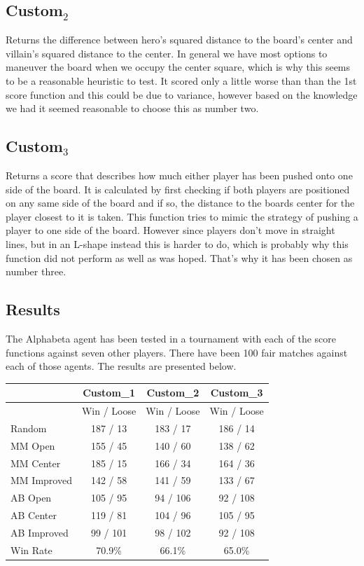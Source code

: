 \documentclass{article}
\begin{document}
\subsection{Custom$_2$}
Returns the difference between hero's squared distance to the board's center and villain's
squared distance to the center. In general we have most options to maneuver the board when
we occupy the center square, which is why this seems to be a reasonable heuristic to test.
It scored only a little worse than than the 1st score function and this could be due to
variance, however based on the knowledge we had it seemed reasonable to choose this as
number two.

\subsection{Custom$_3$}
Returns a score that describes how much either player has been pushed onto one side of the
board. It is calculated by first checking if both players are positioned on any same side
of the board and if so, the distance to the boards center for the player closest to it is
taken. This function tries to mimic the strategy of pushing a player to one side of the board.
However since players don't move in straight lines, but in an L-shape instead this is harder
to do, which is probably why this function did not perform as well as was hoped. That's why
it has been chosen as number three.

\subsection{Results}
The Alphabeta agent has been tested in a tournament with each of the score functions
against seven other players. There have been 100 fair matches against each of those
agents. The results are presented below.

\begin{center}
  \begin{tabular}{ | l || c | c | c | }
    \hline
                     & Custom_1     & Custom_2      & Custom_3    \\ \hline
                     & Win / Loose  & Win / Loose   & Win / Loose \\ \hline \hline
      Random         & 187 / 13     & 183 / 17      & 186 / 14    \\ \hline
      MM Open        & 155 / 45     & 140 / 60      & 138 / 62    \\ \hline
      MM Center      & 185 / 15     & 166 / 34      & 164 / 36    \\ \hline
      MM Improved    & 142 / 58     & 141 / 59      & 133 / 67    \\ \hline
      AB Open        & 105 / 95     & 94 / 106      & 92 / 108    \\ \hline
      AB Center      & 119 / 81     & 104 / 96      & 105 / 95    \\ \hline
      AB Improved    & 99 / 101     & 98 / 102      & 92 / 108    \\ \hline \hline
      Win Rate       & 70.9\%       & 66.1\%        & 65.0\%      \\ \hline
  \end{tabular}
\end{center}
\end{document}
